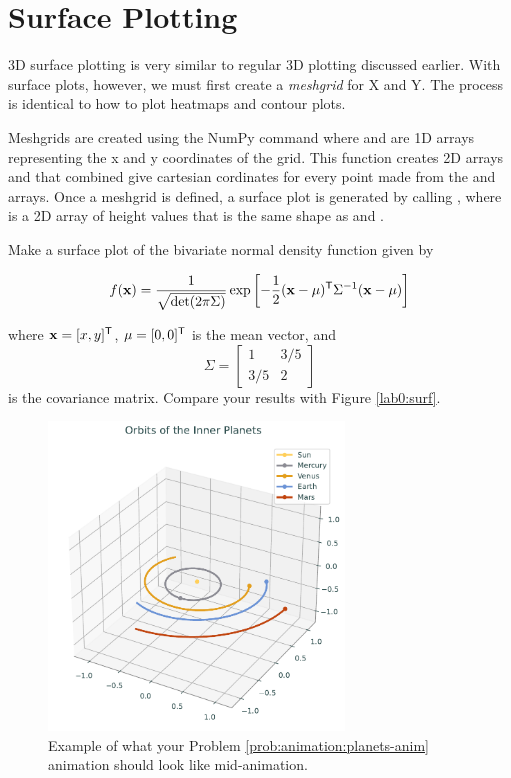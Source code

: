 \section*{Surface Plotting}
3D surface plotting is very similar to regular 3D plotting discussed earlier.
With surface plots, however, we must first create a \textit{meshgrid} for X and Y.
The process is identical to how to plot heatmaps and contour plots.

Meshgrids are created using the NumPy command  where  and  are 1D arrays representing the x and y coordinates of the grid.
This function creates 2D arrays  and  that combined give cartesian cordinates for every point made from the  and  arrays.
Once a meshgrid is defined, a surface plot is generated by calling , where  is a 2D array of height values that is the same shape as  and .

\begin{problem}
Make a surface plot of the bivariate normal density function given by

$$f(\mathbf{x})=\frac{1}{\sqrt{\det(2\pi \Sigma)}}\exp{\left[-\frac{1}{2}(\mathbf{x} - \mu)^{\mathsf T}\Sigma^{-1} (\mathbf{x} - \mu)\right]}$$

where $\mathbf{x}=[x,y]^{\mathsf T} $, $\mu=[0,0]^{\mathsf T} $ is the mean vector, and $$\Sigma = \begin{bmatrix} 1 & 3/5 \\ 3/5 & 2 \end{bmatrix}$$ is the covariance matrix. Compare your results with Figure \ref{lab0:surf}.
\end{problem}

\begin{figure}[H]
	\centering
	\includegraphics[width=0.7\textwidth]{figures/orbits-midanimation.pdf}
	\caption{Example of what your Problem \ref{prob:animation:planets-anim} animation should look like mid-animation.}
	\label{animation:planets-midanimation}
\end{figure}

